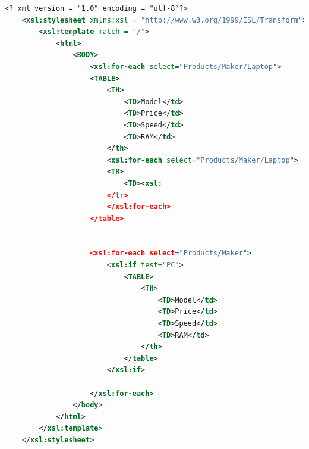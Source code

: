\documentclass[12pt]{article}
\begin{document}
\begin{enumerate}[1.]
\begin{enumerate}[a)]
    \begin{lstlisting}[language=XML]
    <? xml version = "1.0" encoding = "utf-8"?>
    <xsl:stylesheet xmlns:xsl = "http://www.w3.org/1999/ISL/Transform">
        <xsl:template match = "/">
            <html>
                <BODY>
                    <xsl:for-each select="Products/Maker/Laptop">
                    <TABLE>
                        <TH>
                            <TD>Model</td>
                            <TD>Price</td>
                            <TD>Speed</td>
                            <TD>RAM</td>
                        </th>
                        <xsl:for-each select="Products/Maker/Laptop">
                        <TR>
                            <TD><xsl:
                        </tr>
                        </xsl:for-each>
                    </table>


                    <xsl:for-each select="Products/Maker">
                        <xsl:if test="PC">
                            <TABLE>
                                <TH>
                                    <TD>Model</td>
                                    <TD>Price</td>
                                    <TD>Speed</td>
                                    <TD>RAM</td>
                                </th>
                            </table>
                        </xsl:if>

                    </xsl:for-each>
                </body>
            </html>
        </xsl:template>
    </xsl:stylesheet>
    \end{lstlisting}


    \end{enumerate}
\end{enumerate}
\end{document}

